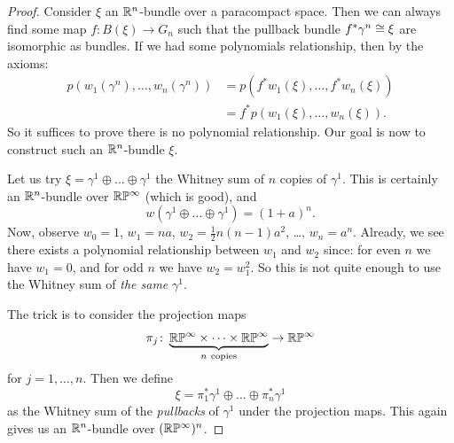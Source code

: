 \begin{proof}
Consider $\xi$ an $\mathbb{R}^{n}$-bundle over a paracompact space. Then we
can always find some map $f\colon B(\xi)\to G_{n}$ such that
the pullback bundle $f^{*}\gamma^{n}\cong\xi$ are isomorphic as
bundles. If we had some polynomials relationship, then by the axioms:
\begin{subequations}
  \begin{align}
p(w_{1}(\gamma^{n}),\dots,w_{n}(\gamma^{n}))
&= p(f^{*}w_{1}(\xi),\dots,f^{*}w_{n}(\xi))\\
&=f^{*}p(w_{1}(\xi),\dots,w_{n}(\xi)).
  \end{align}
\end{subequations}
So it suffices to prove there is no polynomial relationship. Our goal
is now to construct such an $\mathbb{R}^{n}$-bundle $\xi$.

Let us try $\xi=\gamma^{1}\oplus\dots\oplus\gamma^{1}$ the Whitney sum
of $n$ copies of $\gamma^{1}$. This is certainly an $\mathbb{R}^{n}$-bundle
over $\mathbb{R}\mathbb{P}^{\infty}$ (which is good), and
\begin{equation}
w(\gamma^{1}\oplus\dots\oplus\gamma^{1})=(1+a)^{n}.
\end{equation}
Now, observe $w_{0}=1$, $w_{1}=na$, $w_{2}=\frac{1}{2}n(n-1)a^{2}$,
\dots, $w_{n}=a^{n}$. Already, we see there exists a polynomial
relationship between $w_{1}$ and $w_{2}$ since: for even $n$ we have
$w_{1}=0$, and for odd $n$ we have $w_{2}=w_{1}^{2}$. So this is not
quite enough to use the Whitney sum of \emph{the same} $\gamma^{1}$.

The trick is to consider the projection maps
\begin{equation}
\pi_{j}\colon\underbrace{\mathbb{R}\mathbb{P}^{\infty}\times\cdots\times\mathbb{R}\mathbb{P}^{\infty}}_{n~\text{copies}}\to\mathbb{R}\mathbb{P}^{\infty}
\end{equation}
for $j=1,\dots,n$. Then we define
\begin{equation}
\xi = \pi_{1}^{*}\gamma^{1}\oplus\dots\oplus\pi_{n}^{*}\gamma^{1}
\end{equation}
as the Whitney sum of the \emph{pullbacks} of $\gamma^{1}$ under the
projection maps. This again gives us an $\mathbb{R}^{n}$-bundle over
$(\mathbb{R}\mathbb{P}^{\infty})^{n}$.


\end{proof}
